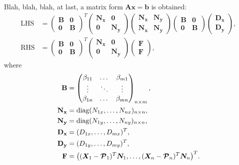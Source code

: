 \documentclass[11pt]{article}
\DeclarePairedDelimiter{\diagfences}{(}{)}
\newcommand{\diag}{\operatorname{diag}\diagfences}
\newcommand{\vX}[1]{\bm{X}_{#1}} %
\newcommand{\vN}[1]{\bm{N}_{#1}} %
\newcommand{\vP}[1]{\bm{\mathcal{P}}_{#1}} %
\newcommand{\mA}{\mathbf{A}} %
\newcommand{\mx}{\mathbf{x}} %
\newcommand{\mb}{\mathbf{b}} %
\newcommand{\mB}{\mathbf{B}} %
\newcommand{\mz}{\mathbf{0}} %
\newcommand{\mF}{\mathbf{F}} %
\newcommand{\mNx}{\mathbf{N_x}} %
\newcommand{\mNy}{\mathbf{N_y}} %
\newcommand{\mDx}{\mathbf{D_x}} %
\newcommand{\mDy}{\mathbf{D_y}} %
\newcommand{\rhs}{\mathrm{RHS}}
\newcommand{\lhs}{\mathrm{LHS}}
\renewcommand{\b}[1]{\beta_{#1}}
\begin{document}
Blah, blah, blah, at last, a matrix form $\mA\mx=\mb$ is obtained:
\[
\begin{split}
\lhs &= 
\begin{pmatrix}
\mB & \mz \\
\mz & \mB
\end{pmatrix}^T
\begin{pmatrix}
\mNx & \mz \\
\mz & \mNy
\end{pmatrix}
\begin{pmatrix}
\mNx & \mNy \\
\mNx & \mNy
\end{pmatrix}
\begin{pmatrix}
\mB & \mz \\
\mz & \mB
\end{pmatrix}
\begin{pmatrix}
\mDx \\
\mDy 
\end{pmatrix},\\
\rhs &=
\begin{pmatrix}
\mB & \mz \\
\mz & \mB
\end{pmatrix}^T
\begin{pmatrix}
\mNx & \mz \\
\mz & \mNy
\end{pmatrix}
\begin{pmatrix}
\mF \\
\mF 
\end{pmatrix},
\end{split}
\]
where
\[
\begin{split}
\mB &= 
\begin{pmatrix}
\b{11} & \dots & \b{m1} \\
\vdots & \ddots & \vdots \\
\b{1n} & \dots & \b{mn}
\end{pmatrix}_{n\times m},\\
\mNx &=
\diag{N_{1x},\dots,N_{nx}}_{n\times n},\\
\mNy &=
\diag{N_{1y},\dots,N_{ny}}_{n\times n},\\
\mDx &= (D_{1x},\dots,D_{mx})^T,\\
\mDy &= (D_{1y},\dots,D_{my})^T,\\
\mF &= \bigl((\vX{1}-\vP{1})^T\vN{1},\dots,(\vX{n}-\vP{n})^T\vN{n}\bigr)^T.
\end{split}
\]
\end{document}
